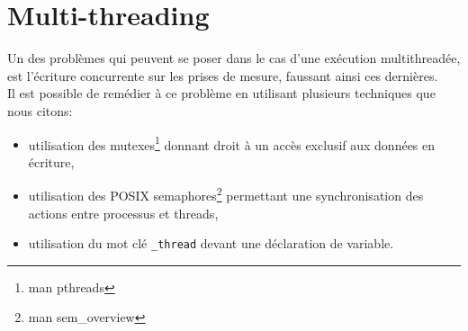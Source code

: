 \section{Multi-threading}

Un des problèmes qui peuvent se poser dans le cas d'une exécution multithreadée, est l'écriture concurrente sur les prises de mesure, faussant ainsi ces dernières.\\

Il est possible de remédier à ce problème en utilisant plusieurs techniques que nous citons:\\

\begin{itemize}

\item utilisation des mutexes\footnote{man pthreads} donnant droit à un accès exclusif aux données en écriture,\\

\item utilisation des POSIX semaphores\footnote{man sem\_overview} permettant une synchronisation des actions entre processus et threads,\\

\item utilisation du mot clé \verb#_thread# devant une déclaration de variable.\\

\end{itemize}
